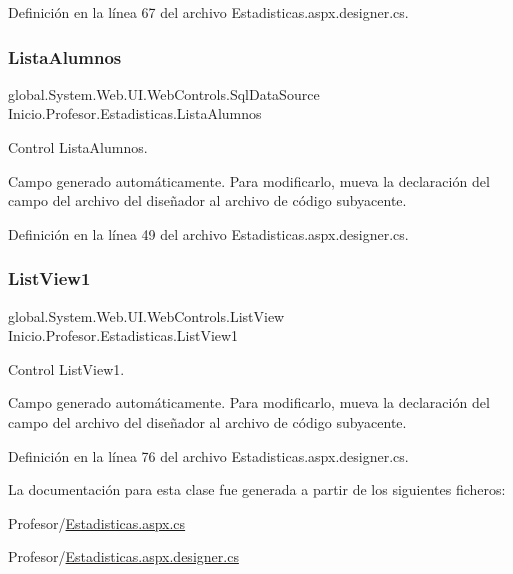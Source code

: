 Definición en la línea 67 del archivo Estadisticas.\+aspx.\+designer.\+cs.

\mbox{\label{classInicio_1_1Profesor_1_1Estadisticas_a0bf55f4a182f6197fb6ed8f0d27b5912}} 
\subsubsection{\texorpdfstring{ListaAlumnos}{ListaAlumnos}}
{\footnotesize\ttfamily global.\+System.\+Web.\+U\+I.\+Web\+Controls.\+Sql\+Data\+Source Inicio.\+Profesor.\+Estadisticas.\+Lista\+Alumnos\hspace{0.3cm}{\ttfamily [protected]}}



Control Lista\+Alumnos. 

Campo generado automáticamente. Para modificarlo, mueva la declaración del campo del archivo del diseñador al archivo de código subyacente. 

Definición en la línea 49 del archivo Estadisticas.\+aspx.\+designer.\+cs.

\mbox{\label{classInicio_1_1Profesor_1_1Estadisticas_a892cbd1efdf1a2be5a806de2a637c3bf}} 
\subsubsection{\texorpdfstring{ListView1}{ListView1}}
{\footnotesize\ttfamily global.\+System.\+Web.\+U\+I.\+Web\+Controls.\+List\+View Inicio.\+Profesor.\+Estadisticas.\+List\+View1\hspace{0.3cm}{\ttfamily [protected]}}



Control List\+View1. 

Campo generado automáticamente. Para modificarlo, mueva la declaración del campo del archivo del diseñador al archivo de código subyacente. 

Definición en la línea 76 del archivo Estadisticas.\+aspx.\+designer.\+cs.



La documentación para esta clase fue generada a partir de los siguientes ficheros\+:\begin{DoxyCompactItemize}
\item 
Profesor/\mbox{\hyperlink{Estadisticas_8aspx_8cs}{Estadisticas.\+aspx.\+cs}}\item 
Profesor/\mbox{\hyperlink{Estadisticas_8aspx_8designer_8cs}{Estadisticas.\+aspx.\+designer.\+cs}}\end{DoxyCompactItemize}
